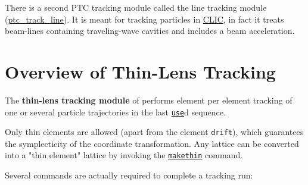 There is a second PTC tracking module called the line tracking module
(\href{../ptc_track_line/ptc_track_line.html}{ptc\_track\_line}). It is
meant for tracking particles in
\href{http://clic-study.web.cern.ch/CLIC-Study/}{CLIC}, in fact it
treats beam-lines containing traveling-wave cavities and includes a beam
acceleration. 







\section{Overview of Thin-Lens Tracking} %
\label{sec:trackoverview}

The \textbf{thin-lens tracking module} of \madx performs element per
element tracking of one or several particle trajectories in the last
\href{../control/general.html#use}{\texttt{use}}d sequence.  
 

Only thin elements are allowed (apart from the element \texttt{drift}),
which guarantees the symplecticity of the coordinate transformation. Any
lattice can be converted into a "thin element" lattice by invoking the
\href{../makethin/makethin.html}{\texttt{makethin}} command. 

Several commands are actually required to complete a tracking run:


